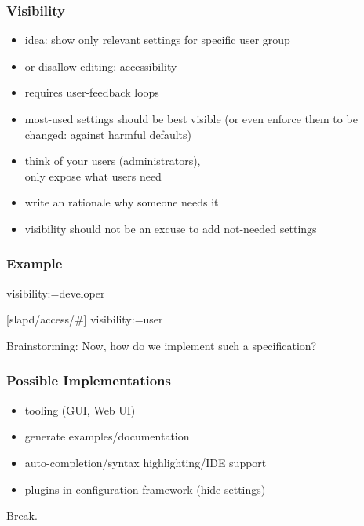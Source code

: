 \begin{frame}
	\frametitle{Visibility}
	\begin{itemize}
	\item idea: show only relevant settings for specific user group
	\item or disallow editing: accessibility
	\pause
	\item requires user-feedback loops~\cite{xu2015hey}
	\item most-used settings should be best visible (or even enforce them to be changed: against harmful defaults)
	\item think of your users (administrators), \\ only expose what users need
	\item write an rationale why someone needs it
	\pause
	\item visibility should not be an excuse to add not-needed settings
	\end{itemize}
\end{frame}

\begin{frame}[fragile]
	\frametitle{Example}
	\begin{code}
	visibility:=developer

	[slapd/access/#]
	visibility:=user
	\end{code}
\end{frame}


\begin{assignment}
	\begin{task}
	Brainstorming: Now, how do we implement such a specification?
	\end{task}
\end{assignment}

\begin{frame}
	\frametitle{Possible Implementations}
	\begin{itemize}
	\item tooling (GUI, Web UI)
	\item generate examples/documentation
	\item auto-completion/syntax highlighting/IDE support
	\item plugins in configuration framework (hide settings)
	\end{itemize}
\end{frame}

\begin{assignment}
	\begin{task}
	Break.
	\end{task}
\end{assignment}

